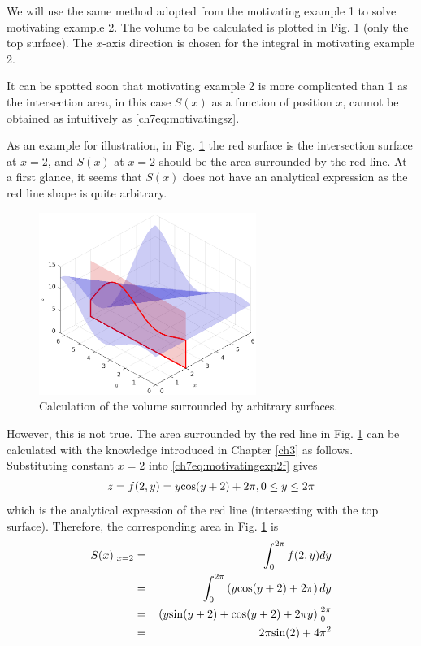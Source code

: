 We will use the same method adopted from the motivating example 1 to solve motivating example 2. The volume to be calculated is plotted in Fig. \ref{ch7fig:motivatingexp2} (only the top surface). The $x$-axis direction is chosen for the integral in motivating example 2.

It can be spotted soon that motivating example 2 is more complicated than 1 as the intersection area, in this case $S(x)$ as a function of position $x$, cannot be obtained as intuitively as \eqref{ch7eq:motivatingsz}.

As an example for illustration, in Fig. \ref{ch7fig:motivatingexp2} the red surface is the intersection surface at $x=2$, and $S(x)$ at $x=2$ should be the area surrounded by the red line. At a first glance, it seems that $S(x)$ does not have an analytical expression as the red line shape is quite arbitrary.

\begin{figure}
	\centering
	\includegraphics[width=200pt]{chapters/chapter7/figures/motivatingexp2.eps}
	\caption{Calculation of the volume surrounded by arbitrary surfaces.} \label{ch7fig:motivatingexp2}
\end{figure}

However, this is not true. The area surrounded by the red line in Fig. \ref{ch7fig:motivatingexp2} can be calculated with the knowledge introduced in Chapter \ref{ch3} as follows. Substituting constant $x=2$ into \eqref{ch7eq:motivatingexp2f} gives
\begin{eqnarray}
	z = f(2,y) = y\textup{cos}(y+2) + 2\pi, 0\leq y\leq2\pi \nonumber
\end{eqnarray}
which is the analytical expression of the red line (intersecting with the top surface). Therefore, the corresponding area in Fig. \ref{ch7fig:motivatingexp2} is
\begin{eqnarray}
	S(x)|_{x=2} &=& \int_{0}^{2\pi} f(2,y) dy \nonumber \\ &=& \int_{0}^{2\pi}\left(y\textup{cos}(y+2) + 2\pi\right)dy \nonumber \\
	&=& \left.\left(y\textup{sin}(y+2)+\textup{cos}(y+2) + 2\pi y\right)\right|_{0}^{2\pi} \nonumber \\
	&=& 2\pi\textup{sin}(2) + 4\pi^2 \nonumber
\end{eqnarray}

